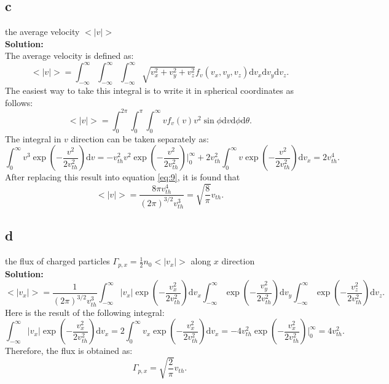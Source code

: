\documentclass[11pt]{amsart}
\begin{document}
\subsection*{c}
the average velocity $<\left | v \right |>$
\\
\textbf{Solution:}\\
The average velocity is defined as:
\begin{equation}
\label{eq:8}
<\left | v \right |>=\int_{-\infty}^{\infty}\int_{-\infty}^{\infty}\int_{-\infty}^{\infty}\sqrt{v_{x}^2+v_{y}^2+v_{z}^2}f_v(v_x,v_y,v_z)\mathrm{d}v_x\mathrm{d}v_y\mathrm{d}v_z.
\end{equation}
The easiest way to take this integral is to write it in spherical coordinates as follows:
\begin{equation}
\label{eq:9}
<\left | v \right |>=\int_{0}^{2\pi}\int_{0}^{\pi}\int_{0}^{\infty}vf_v(v)v^2\sin \phi\mathrm{d}v\mathrm{d}\phi\mathrm{d}\theta.
\end{equation}
The integral in $v$ direction can be taken separately as:
\begin{equation}
\label{eq:10}
\int_{0}^{\infty}v^3\exp(-\frac{v^2}{2 v_{th}^2})\mathrm{d}v=-v_{th}^2 v^2\exp(-\frac{v^2}{2 v_{th}^2})\Biggr|_{0}^{\infty}+2v_{th}^2\int_{0}^{\infty}v\exp(-\frac{v^2}{2 v_{th}^2})\mathrm{d}v_x=2v_{th}^4.
\end{equation}
After replacing this result into equation \ref{eq:9}, it is found that
\begin{equation}
\label{eq:11}
<\left | v \right |>=\frac{8\pi v_{th}^4}{(2 \pi)^{3/2}v_{th}^3}=\sqrt{\frac{8}{\pi}}v_{th}.
\end{equation}
\subsection*{d}
the flux of charged particles $\Gamma_{p,x}=\frac{1}{2}n_0<\left | v_x \right |>$ along $x$ direction
\\
\textbf{Solution:}\\
\begin{equation}
\label{eq:12}
<\left | v_x \right |>=\frac{1}{(2 \pi)^{3/2}v_{th}^3}\int_{-\infty}^{\infty}\left | v_x \right |\exp(-\frac{v_{x}^2}{2 v_{th}^2})\mathrm{d}v_x\int_{-\infty}^{\infty}\exp(-\frac{v_{y}^2}{2 v_{th}^2})\mathrm{d}v_y\int_{-\infty}^{\infty}\exp(-\frac{v_{z}^2}{2 v_{th}^2})\mathrm{d}v_z.
\end{equation}
Here is the result of the following integral:
\begin{equation}
\int_{-\infty}^{\infty}\left | v_x \right |\exp(-\frac{v_{x}^2}{2 v_{th}^2})\mathrm{d}v_x=2\int_{0}^{\infty}v_x \exp(-\frac{v_{x}^2}{2 v_{th}^2})\mathrm{d}v_x=-4v_{th}^2 \exp(-\frac{v_{x}^2}{2 v_{th}^2})\Biggr|_{0}^{\infty}=4v_{th}^2.
\end{equation}
Therefore, the flux is obtained as:
 \begin{equation}
 \Gamma_{p,x}=\sqrt{\frac{2}{\pi}}v_{th}.
 \end{equation}
\end{document}
